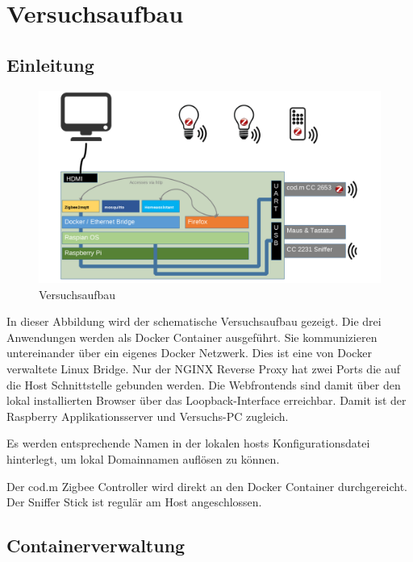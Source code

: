 \chapter{Versuchsaufbau}
\section{Einleitung}

\begin{figure}[H]
    \centering
    \includegraphics[width=1\textwidth]{media/Versuchsaufbau/image1.png}
    \caption{Versuchsaufbau}
  \end{figure}

In dieser Abbildung wird der schematische Versuchsaufbau gezeigt. Die drei Anwendungen werden als Docker Container ausgeführt. Sie kommunizieren
untereinander über ein eigenes Docker Netzwerk. Dies ist eine von Docker verwaltete Linux Bridge. Nur der NGINX Reverse Proxy hat zwei Ports die
auf die Host Schnittstelle gebunden werden. Die Webfrontends sind damit über den lokal installierten Browser über das Loopback-Interface erreichbar. 
Damit ist der Raspberry Applikationsserver und Versuchs-PC zugleich.

Es werden entsprechende Namen in der lokalen \grqq hosts\grqq{} Konfigurationsdatei hinterlegt, um lokal Domainnamen auflösen zu können.

Der cod.m Zigbee Controller wird direkt an den Docker Container durchgereicht. Der Sniffer Stick ist regulär am Host angeschlossen. 

\section{Containerverwaltung}



